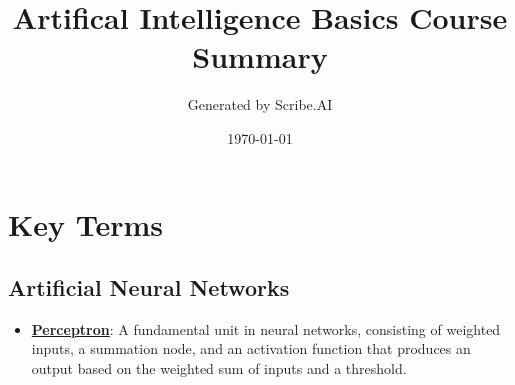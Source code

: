 \documentclass{article}%
\title{Artifical Intelligence Basics Course Summary}%
\author{Generated by Scribe.AI}%
\date{\today}%
\begin{document}
%
\normalsize%
\maketitle%
\section{Key Terms}%
\label{sec:KeyTerms}%
\subsection{Artificial Neural Networks}%
\label{subsec:ArtificialNeuralNetworks}%
\begin{itemize}[leftmargin=*]%
\item \href{https://purdue.brightspace.com/d2l/common/assets/pdfjs-d2l-dist/1.0.14-legacy/web/viewer.html?file=\%2Fcontent\%2Fenforced\%2F1095467-wl.202510.CS.24300.001\%2F02L2-Intro.pdf\%3Fou\%3D1095467\&lang=en-us\&container=d2l-fileviewer-rendered-pdf\&fullscreen=d2l-fileviewer-rendered-pdf-dialog\&height=667#page=45}{\textbf{Perceptron}}: A fundamental unit in neural networks, consisting of weighted inputs, a summation node, and an activation function that produces an output based on the weighted sum of inputs and a threshold.%
\end{itemize}

%
\end{document}
